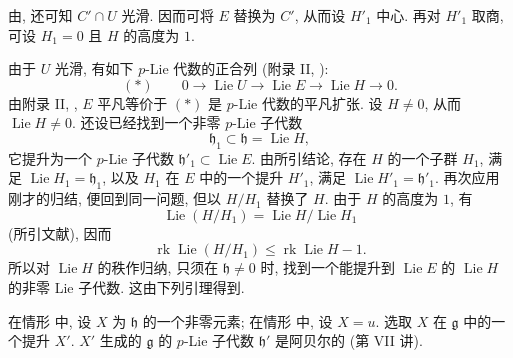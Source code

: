 由, 还可知 \(C'\cap U\) 光滑.
因而可将 \(E\) 替换为 \(C'\), 从而设 \(H'_1\) 中心.
再对 \(H'_1\) 取商, 可设 \(H_1=0\) 且 \(H\) 的高度为 \(1\).

由于 \(U\) 光滑, 有如下 \(p\)-Lie 代数的正合列
(附录 II, ):
\[
  (*)\qquad
  0\longrightarrow\operatorname{Lie}U
   \longrightarrow\operatorname{Lie}E
   \longrightarrow\operatorname{Lie}H
   \longrightarrow0.
\]
由附录 II, ,
\(E\) 平凡等价于 \((*)\) 是 \(p\)-Lie 代数的平凡扩张.
设 \(H\ne0\), 从而 \(\operatorname{Lie}H\ne0\).
还设已经找到一个非零 \(p\)-Lie 子代数
\[
  \mathfrak h_1\subset\mathfrak h=\operatorname{Lie}H,
\]
它提升为一个 \(p\)-Lie 子代数 \(\mathfrak h'_1\subset\operatorname{Lie}E\).
由所引结论, 存在 \(H\) 的一个子群 \(H_1\), 满足
\(\operatorname{Lie}H_1=\mathfrak h_1\),
以及 \(H_1\) 在 \(E\) 中的一个提升 \(H'_1\), 满足
\(\operatorname{Lie}H'_1=\mathfrak h'_1\).
再次应用刚才的归结, 便回到同一问题, 但以 \(H/H_1\) 替换了 \(H\).
由于 \(H\) 的高度为 \(1\), 有
\[
  \operatorname{Lie}(H/H_1)
   =\operatorname{Lie}H/\operatorname{Lie}H_1
\]
(所引文献), 因而
\[
  \operatorname{rk}\operatorname{Lie}(H/H_1)
  \leq \operatorname{rk}\operatorname{Lie}H-1.
\]
所以对 \(\operatorname{Lie}H\) 的秩作归纳,
只须在 \(\mathfrak h\ne0\) 时, 找到一个能提升到 \(\operatorname{Lie}E\)
的 \(\operatorname{Lie}H\) 的非零 Lie 子代数. 这由下列引理得到.


在情形 中,
设 \(X\) 为 \(\mathfrak h\) 的一个非零元素;
在情形 中, 设 \(X=u\).
选取 \(X\) 在 \(\mathfrak g\) 中的一个提升 \(X'\).
\(X'\) 生成的 \(\mathfrak g\) 的 \(p\)-Lie 子代数 \(\mathfrak h'\) 是阿贝尔的 (第 VII 讲).

